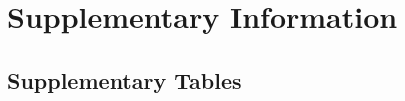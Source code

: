 \clearpage
\newpage

\renewcommand{\thesection}{S\arabic{section}}
\renewcommand{\thetable}{S\arabic{table}}
\renewcommand{\thefigure}{S\arabic{figure}}
\setcounter{figure}{0}
\setcounter{table}{0}
\setcounter{section}{0}
\setcounter{page}{1}

\section{Supplementary Information}

\localtableofcontents








\FloatBarrier



\FloatBarrier

\subsection{Supplementary Tables}






